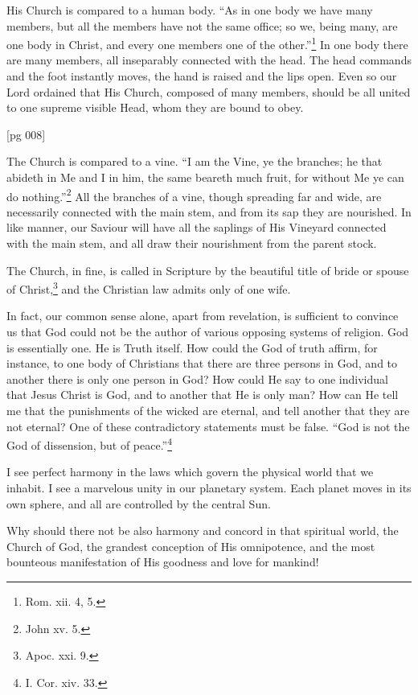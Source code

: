 His Church is compared to a human body. “As
in one body we have many members, but all the
members have not the same office; so we, being
many, are one body in Christ, and every one members
one of the other.”\footnote{Rom. xii. 4,
5.} In one body there are
many members, all inseparably connected with the
head. The head commands and the foot instantly
moves, the hand is raised and the lips open. Even
so our Lord ordained that His Church, composed
of many members, should be all united to one
supreme visible Head, whom they are bound to
obey.

[pg 008]

The Church is compared to a vine. “I am the
Vine, ye the branches; he that abideth in Me and I
in him, the same beareth much fruit, for without
Me ye can do nothing.”\footnote{John xv.
5.} All the branches of a
vine, though spreading far and wide, are necessarily
connected with the main stem, and from its
sap they are nourished. In like manner, our
Saviour will have all the saplings of His Vineyard
connected with the main stem, and all draw their
nourishment from the parent stock.

The Church, in fine, is called in Scripture by the
beautiful title of bride or spouse of Christ,\footnote{Apoc.
xxi. 9.} and
the Christian law admits only of one wife.

In fact, our common sense alone, apart from
revelation, is sufficient to convince us that God
could not be the author of various opposing systems
of religion. God is essentially one. He is
Truth itself. How could the God of truth affirm,
for instance, to one body of Christians that there
are three persons in God, and to another there is
only one person in God? How could He say to
one individual that Jesus Christ is God, and to
another that He is only man? How can He tell me
that the punishments of the wicked are eternal,
and tell another that they are not eternal? One of
these contradictory statements must be false.
“God is not the God of dissension, but of peace.”\footnote{I.
Cor. xiv. 33.}

I see perfect harmony in the laws which govern
the physical world that we inhabit. I see a marvelous
unity in our planetary system. Each
planet moves in its own sphere, and all are controlled
by the central Sun.

Why should there not be also harmony and concord
in that spiritual world, the Church of God,
the grandest conception of His omnipotence, and
the most bounteous manifestation of His goodness
and love for mankind!

